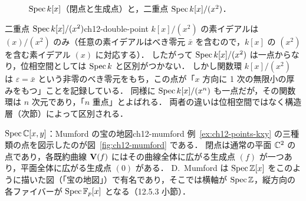 \begin{figure}[htbp]
\centering
{}
\caption{$\operatorname{Spec} k[x]$（閉点と生成点）と，二重点 $\operatorname{Spec} k[x]/(x^2)$．}
\label{fig:ch12-speckx}
\end{figure}

\begin{myex}{二重点 $\operatorname{Spec} k[x]/(x^2)$}{ch12-double-point}
$k[x]/(x^2)$ の素イデアルは $(x)/(x^2)$ のみ（任意の素イデアルはべき零元 $\bar{x}$ を含むので，$k[x]$ の $(x^2)$ を含む素イデアル $(x)$ に対応する）．
したがって $\operatorname{Spec} k[x]/(x^2)$ は一点からなり，位相空間としては $\operatorname{Spec} k$ と区別がつかない．
しかし関数環 $k[x]/(x^2)$ は $\varepsilon=\bar x$ という非零のべき零元をもち，この点が「$x$ 方向に 1 次の無限小の厚みをもつ」ことを記録している．
同様に $\operatorname{Spec} k[x]/(x^n)$ も一点だが，その関数環は $n$ 次元であり，「$n$ 重点」とよばれる．
両者の違いは位相空間ではなく構造層（次節）によって区別される．
\end{myex}

\begin{myex}{$\operatorname{Spec}\mathbb{C}[x,y]$：Mumford の宝の地図}{ch12-mumford}
例~\ref{ex:ch12-points-kxy} の三種類の点を図示したのが図~\ref{fig:ch12-mumford} である．
閉点は通常の平面 $\mathbb{C}^2$ の点であり，各既約曲線 $\mathbf{V}(f)$ にはその曲線全体に広がる生成点 $(f)$ が一つあり，平面全体に広がる生成点 $(0)$ がある．
D.~Mumford は $\operatorname{Spec}\mathbb{Z}[x]$ をこのように描いた図（「宝の地図」）で有名であり，そこでは横軸が $\operatorname{Spec}\mathbb{Z}$，縦方向の各ファイバーが $\operatorname{Spec}\mathbb{F}_p[x]$ となる（12.5.3 小節）．
\end{myex}

